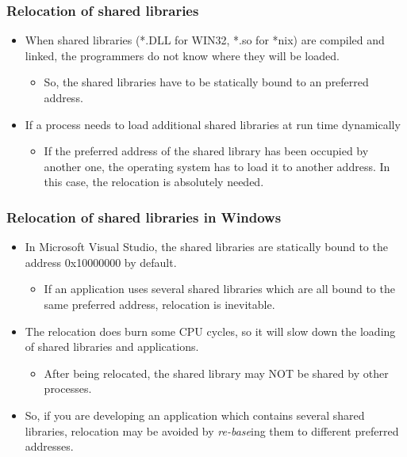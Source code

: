 \documentclass[CJKutf8,xcolor=pdftex,dvipsnames,table]{beamer}
\begin{document}
\begin{CJK*}{UTF8}{song}
  \begin{frame}
    \frametitle{Relocation of shared libraries} \pause
    \begin{itemize}
    \item{When shared libraries (*.DLL for WIN32, *.so for *nix) are compiled and linked, the programmers do not know where they will be loaded.} \pause
      \begin{itemize}
      \item{So, the shared libraries have to be statically bound to an preferred address.} \pause
      \end{itemize}
    \item{If a process needs to load additional shared libraries at run time dynamically} \pause
      \begin{itemize}
      \item{If the preferred address of the shared library has been occupied by another one, the operating system has to load it to another address. In this case, the relocation is absolutely needed.}
      \end{itemize}
    \end{itemize}
  \end{frame}

  
  \begin{frame}
    \frametitle{Relocation of shared libraries in Windows} \pause
    \begin{itemize}
    \item{In Microsoft Visual Studio, the shared libraries are statically bound to the address 0x10000000 by default.} \pause
      \begin{itemize}
      \item{If an application uses several shared libraries which are all bound to the same preferred address, relocation is inevitable.} \pause
      \end{itemize}
    \item{The relocation does burn some CPU cycles, so it will slow down the loading of shared libraries and applications.} \pause
      \begin{itemize}
      \item{After being relocated, the shared library may NOT be shared by other processes.} \pause
      \end{itemize}
    \item{So, if you are developing an application which contains several shared libraries, relocation may be avoided by \emph{re-base}ing them to different preferred addresses.}
    \end{itemize}
  \end{frame}
  

\end{CJK*}
\end{document}
